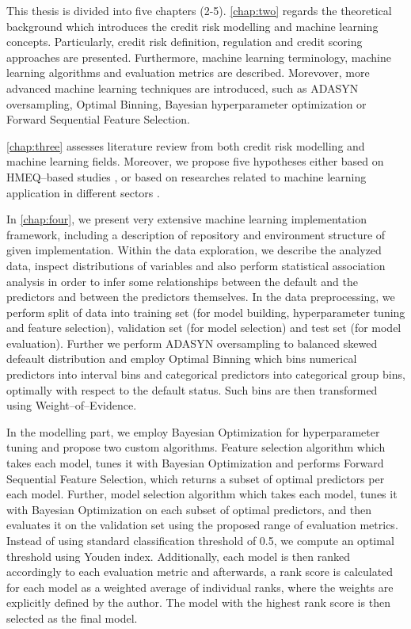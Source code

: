 This thesis is divided into five chapters (2-5).  \autoref{chap:two} regards the theoretical background which introduces the credit risk modelling and machine learning concepts. Particularly, credit risk definition, regulation and credit scoring approaches are presented.
Furthermore, machine learning terminology, machine learning algorithms and evaluation metrics are described.
Morevover, more advanced machine learning techniques are introduced, such as ADASYN oversampling, Optimal Binning, Bayesian hyperparameter optimization or Forward Sequential Feature Selection.

\autoref{chap:three} assesses literature review from both credit risk modelling and machine learning fields. Moreover, we propose five hypotheses either based on HMEQ--based studies \citep{serkan2021bagging, zurada2014classification}, or based on researches related to machine learning application in different sectors \citep{de2023predicting, pintelas2020grey, wu2018accurate}.

In \autoref{chap:four}, we present very extensive machine learning implementation framework, including a description of repository and environment structure of given implementation. Within the data exploration, we describe the analyzed data, inspect distributions of variables and also perform statistical association analysis in order to infer some relationships between the default and the predictors and between the predictors themselves.
In the data preprocessing, we perform split of data into training set (for model building, hyperparameter tuning and feature selection), validation set (for model selection) and test set (for model evaluation).
Further we perform ADASYN oversampling to balanced skewed defeault distribution and employ Optimal Binning which bins numerical predictors into interval bins and categorical predictors into categorical group bins, optimally with respect to the default status. Such bins are then transformed using Weight--of--Evidence.

In the modelling part, we employ Bayesian Optimization for hyperparameter tuning and propose two custom algorithms. Feature selection algorithm which takes each model, tunes it with Bayesian Optimization and performs Forward Sequential Feature Selection, which returns a subset of optimal predictors per each model.
Further, model selection algorithm which takes each model, tunes it with Bayesian Optimization on each subset of optimal predictors, and then evaluates it on the validation set using the proposed range of evaluation metrics. Instead of using standard classification threshold of 0.5, we compute an optimal threshold using Youden index.
Additionally, each model is then ranked accordingly to each evaluation metric and afterwards, a rank score is calculated for each model as a weighted average of individual ranks, where the weights are explicitly defined by the author. The model with the highest rank score is then selected as the final model.

